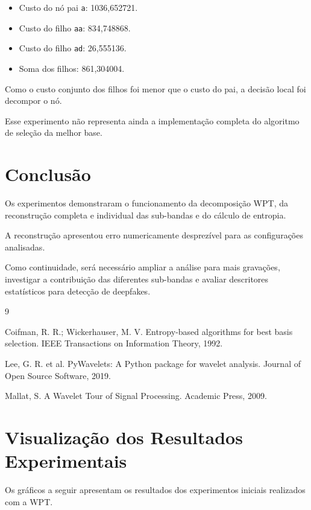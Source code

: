 \documentclass[12pt,a4paper]{article}
\begin{document}
\begin{itemize}
\item Custo do nó pai \texttt{a}: 1036,652721.
\item Custo do filho \texttt{aa}: 834,748868.
\item Custo do filho \texttt{ad}: 26,555136.
\item Soma dos filhos: 861,304004.
\end{itemize}

Como o custo conjunto dos filhos foi menor
que o custo do pai, a decisão local foi
decompor o nó.

Esse experimento não representa ainda
a implementação completa do algoritmo
de seleção da melhor base.

\section{Conclusão}

Os experimentos demonstraram o funcionamento
da decomposição WPT, da reconstrução completa
e individual das sub-bandas e do cálculo de
entropia.

A reconstrução apresentou erro numericamente
desprezível para as configurações analisadas.

Como continuidade, será necessário ampliar
a análise para mais gravações, investigar
a contribuição das diferentes sub-bandas
e avaliar descritores estatísticos para
detecção de deepfakes.

\begin{thebibliography}{9}

Coifman, R. R.; Wickerhauser, M. V.
Entropy-based algorithms for best basis selection.
IEEE Transactions on Information Theory, 1992.

Lee, G. R. et al.
PyWavelets: A Python package for wavelet analysis.
Journal of Open Source Software, 2019.

Mallat, S.
A Wavelet Tour of Signal Processing.
Academic Press, 2009.

\end{thebibliography}


\section{Visualização dos Resultados Experimentais}

Os gráficos a seguir apresentam os resultados dos
experimentos iniciais realizados com a WPT.
\end{document}
